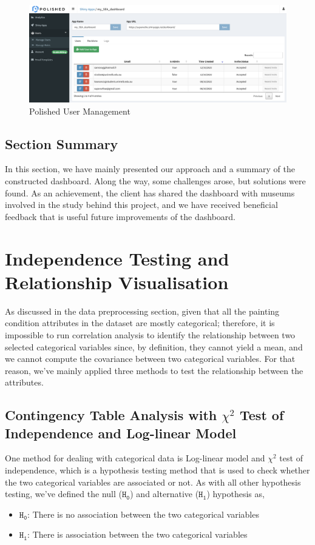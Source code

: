 \documentclass[11pt, oneside]{article}
\begin{document}
\begin{figure}[H]
    \centering
    \includegraphics[scale=0.3]{images/Polished_2.png}
    \caption{Polished User Management}
    \label{Polished_dashboard_2}
\end{figure}

\subsection{Section Summary}
In this section, we have mainly presented our approach and a summary of the constructed dashboard. Along the way, some challenges arose, but solutions were found. As an achievement, the client has shared the dashboard with museums involved in the study behind this project, and we have received beneficial feedback that is useful future improvements of the dashboard.

\section{Independence Testing and Relationship Visualisation}
As discussed in the data preprocessing section, given that all the painting condition attributes in the dataset are mostly categorical; therefore, it is impossible to run correlation analysis to identify the relationship between two selected categorical variables since, by definition, they cannot yield a mean, and we cannot compute the covariance between two categorical variables. For that reason, we've mainly applied three methods to test the relationship between the attributes.

\subsection{Contingency Table Analysis with $\chi^2$ Test of Independence and Log-linear Model}
One method for dealing with categorical data is Log-linear model and $\chi^2$ test of independence, which is a hypothesis testing method that is used to check whether the two categorical variables are associated or not. As with all other hypothesis testing, we've defined the null ($\mathtt{H_0}$) and alternative ($\mathtt{H_1}$) hypothesis as,
\begin{itemize}
    \item $\mathtt{H_0}$: There is no association between the two categorical variables
    \item $\mathtt{H_1}$: There is association between the two categorical variables
\end{itemize}
\end{document}

